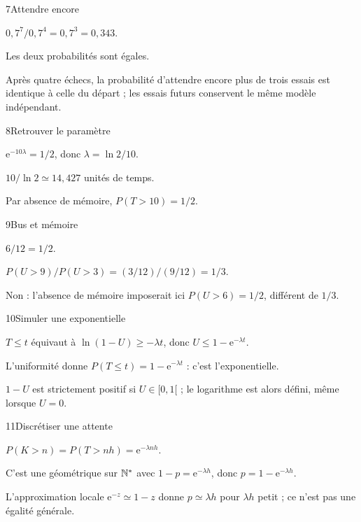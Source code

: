 \begin{corrige}{7}{Attendre encore}
\begin{questions}
\item $0{,}7^7/0{,}7^4=0{,}7^3=0{,}343$.
\item Les deux probabilités sont égales.
\item Après quatre échecs, la probabilité d’attendre encore plus de trois essais est identique à celle du départ ; les essais futurs conservent le même modèle indépendant.
\end{questions}
\end{corrige}
\begin{corrige}{8}{Retrouver le paramètre}
\begin{questions}
\item $\mathrm e^{-10\lambda}=1/2$, donc $\lambda=\ln2/10$.
\item $10/\ln2\simeq14{,}427$ unités de temps.
\item Par absence de mémoire, $P(T>10)=1/2$.
\end{questions}
\end{corrige}
\begin{corrige}{9}{Bus et mémoire}
\begin{questions}
\item $6/12=1/2$.
\item $P(U>9)/P(U>3)=(3/12)/(9/12)=1/3$.
\item Non : l’absence de mémoire imposerait ici $P(U>6)=1/2$, différent de $1/3$.
\end{questions}
\end{corrige}
\begin{corrige}{10}{Simuler une exponentielle}
\begin{questions}
\item $T\leq t$ équivaut à $\ln(1-U)\geq-\lambda t$, donc $U\leq1-\mathrm e^{-\lambda t}$.
\item L’uniformité donne $P(T\leq t)=1-\mathrm e^{-\lambda t}$ : c’est l’exponentielle.
\item $1-U$ est strictement positif si $U\in[0,1[$ ; le logarithme est alors défini, même lorsque $U=0$.
\end{questions}
\end{corrige}
\begin{corrige}{11}{Discrétiser une attente}
\begin{questions}
\item $P(K>n)=P(T>nh)=\mathrm e^{-\lambda nh}$.
\item C’est une géométrique sur $\mathbb{N}^*$ avec $1-p=\mathrm e^{-\lambda h}$, donc $p=1-\mathrm e^{-\lambda h}$.
\item L’approximation locale $\mathrm e^{-z}\simeq1-z$ donne $p\simeq\lambda h$ pour $\lambda h$ petit ; ce n’est pas une égalité générale.
\end{questions}
\end{corrige}
